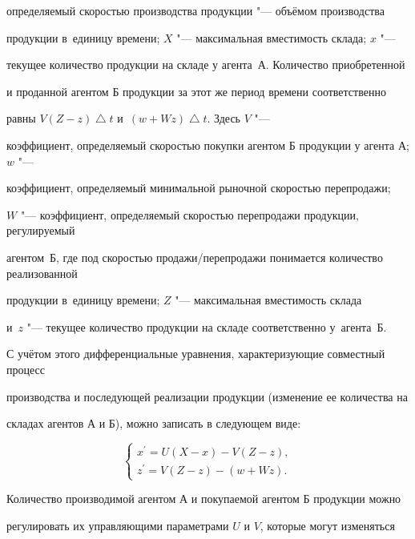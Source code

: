 определяемый скоростью производства продукции "--- объёмом производства

продукции в~единицу времени; $X$ "--- максимальная вместимость склада; $x$ "---

текущее количество продукции на складе у агента~А. Количество приобретенной

и проданной агентом Б продукции за этот же период времени соответственно

равны \mbox{$V(Z-z)\bigtriangleup t$} и~$(w+Wz)\bigtriangleup t$. Здесь $V$ "---

коэффициент, определяемый скоростью покупки агентом Б продукции у агента А; $w$ "---

коэффициент, определяемый минимальной рыночной скоростью перепродажи;

$W$ "---  коэффициент, определяемый скоростью перепродажи продукции, регулируемый

агентом~Б, где под скоростью продажи/перепродажи понимается количество реализованной

продукции в~единицу времени; $Z$ "---  максимальная вместимость склада

и~$z$ "---  текущее количество продукции на складе соответственно у~агента~Б.



С учётом этого дифференциальные уравнения, характеризующие совместный процесс

производства и последующей реализации продукции (изменение ее количества на

складах агентов А и Б), можно записать в следующем виде:

\begin{equation}

\label{f1}

\left \{ \begin{aligned}

x^\prime=U(X-x)-V(Z-z),\\

z^\prime=V(Z-z)-(w+Wz).

\end{aligned}

\right.

\end{equation}



Количество производимой агентом А и покупаемой агентом Б продукции можно

регулировать их управляющими параметрами $U$ и $V$, которые могут изменяться

